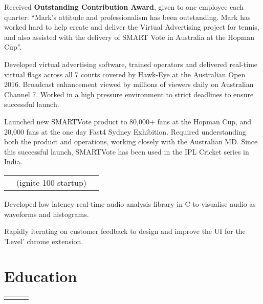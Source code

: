 \documentclass[a4paper]{deedy-resume}
\begin{document}
\begin{tightitemize}
	\item Received \textbf{Outstanding Contribution Award}, given to one employee each quarter: ``Mark's attitude and professionalism has been outstanding. Mark has worked hard to help create and deliver the Virtual Advertising project for tennis, and also assisted with the delivery of SMART Vote in Australia at the Hopman Cup''.
	\item Developed virtual advertising software, trained operators and delivered real-time virtual flags across all 7 courts covered by Hawk-Eye at the Australian Open 2016. Broadcast enhancement viewed by millions of viewers daily on Australian Channel 7. Worked in a high pressure environment to strict deadlines to ensure successful launch.
	\item Launched new SMARTVote product to 80,000+ fans at the Hopman Cup, and 20,000 fans at the one day Fast4 Sydney Exhibition. Required understanding both the product and operations, working closely with the Australian MD. Since this successful launch, SMARTVote has been used in the IPL Cricket series in India.
\end{tightitemize}
\sectionspace

\noindent\begin{tabularx}{\textwidth}{@{}YQZ@{}}
 &  \normalsize{(ignite 100 startup)} & 
\end{tabularx}

\vspace{1 mm}
\begin{tightitemize}
	\item Developed low latency real-time audio analysis library in C to visualise audio as waveforms and histograms.\vspace{-0.5mm}
	\item Rapidly iterating on customer feedback to design and improve the UI for the 'Level' chrome extension.
\end{tightitemize}
\sectionspace

\section{Education}
\normalfont
{}
\vspace{2 mm}
\noindent\begin{tabularx}{\textwidth}{@{}YQZ@{}}
&  & 
\end{tabularx}
\end{document}
